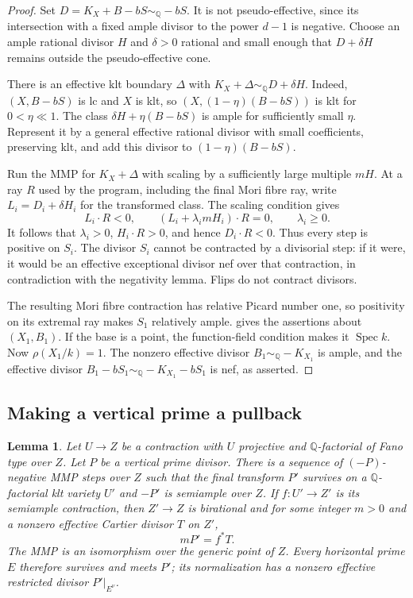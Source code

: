 \documentclass[11pt]{article}
\numberwithin{equation}{section}
\newtheorem{lemma}[theorem]{Lemma}
\theoremstyle{definition}
\newcommand{\Q}{\mathbb Q}
\newcommand{\Spec}{\operatorname{Spec}}
\newcommand{\simq}{\sim_{\Q}}
\begin{document}
\begin{proof}
Set $D=K_X+B-bS\simq-bS$. It is not pseudo-effective, since its
intersection with a fixed ample divisor to the power $d-1$ is
negative. Choose an ample rational divisor $H$ and $\delta>0$
rational and small enough that $D+\delta H$ remains outside the
pseudo-effective cone.

There is an effective klt boundary $\Delta$ with
$K_X+\Delta\simq D+\delta H$. Indeed, $(X,B-bS)$ is lc and $X$ is
klt, so $(X,(1-\eta)(B-bS))$ is klt for $0<\eta\ll1$. The class
$\delta H+\eta(B-bS)$ is ample for sufficiently small $\eta$.
Represent it by a general effective rational divisor with small
coefficients, preserving klt, and add this divisor to
$(1-\eta)(B-bS)$.

Run the MMP for $K_X+\Delta$ with scaling by a sufficiently large
multiple $mH$. At a ray $R$ used by the program, including the final
Mori fibre ray, write $L_i=D_i+\delta H_i$ for the transformed class.
The scaling condition gives
\[
 L_i\cdot R<0,\qquad (L_i+\lambda_i mH_i)\cdot R=0,
 \qquad \lambda_i\geq0.
\]
It follows that $\lambda_i>0$, $H_i\cdot R>0$, and hence
$D_i\cdot R<0$. Thus every step is positive on $S_i$. The divisor
$S_i$ cannot be contracted by a divisorial step: if it were, it would
be an effective exceptional divisor nef over that contraction, in
contradiction with the negativity lemma. Flips do not contract divisors.

The resulting Mori fibre contraction has relative Picard number one,
so positivity on its extremal ray makes $S_1$ relatively ample.
 gives the assertions about $(X_1,B_1)$. If the base
is a point, the function-field condition makes it $\Spec k$. Now
$\rho(X_1/k)=1$. The nonzero effective divisor $B_1\simq-K_{X_1}$
is ample, and the effective divisor
$B_1-bS_1\simq-K_{X_1}-bS_1$ is nef, as asserted.
\end{proof}

\subsection{Making a vertical prime a pullback}

\begin{lemma}\label{lem:vertical}
Let $U\to Z$ be a contraction with $U$ projective and $\Q$-factorial
of Fano type over $Z$. Let $P$ be a vertical prime divisor. There is a
sequence of $(-P)$-negative MMP steps over $Z$ such that the final
transform $P'$ survives on a $\Q$-factorial klt variety $U'$ and
$-P'$ is semiample over $Z$. If $f:U'\to Z'$ is its
semiample contraction, then $Z'\to Z$ is birational and for some
integer $m>0$ and a nonzero effective Cartier divisor $T$ on $Z'$,
\begin{equation}\label{eq:pullback}
 mP'=f^*T.
\end{equation}
The MMP is an isomorphism over the generic point of $Z$. Every
horizontal prime $E$ therefore survives and meets $P'$; its
normalization has a nonzero effective restricted divisor
$P'|_{E^\nu}$.
\end{lemma}
\end{document}
